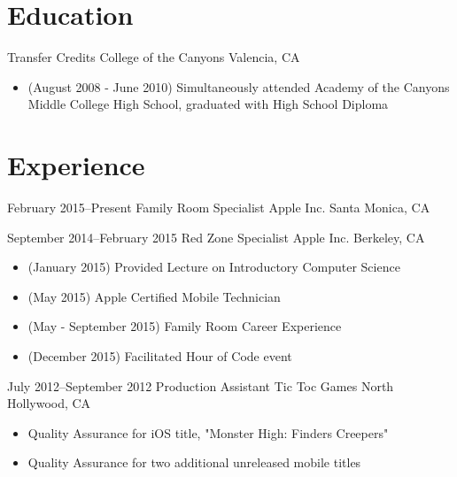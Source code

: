\documentclass[11pt,a4paper,sans]{moderncv}        %
\begin{document}
\makecvtitle

\section{Education}
 {Transfer Credits}
{College of the Canyons}    {Valencia, CA}
{}
{
  \begin{itemize}
  \item (August 2008 - June 2010) Simultaneously attended Academy of the Canyons Middle College High School, graduated with High School Diploma
  \end{itemize}
}

\section{Experience}		%
\cventry
{February 2015--Present}    {Family Room Specialist}
{Apple Inc.}                {Santa Monica, CA}
{}
{}      %

\cventry
{September 2014--February 2015}	{Red Zone Specialist}
{Apple Inc.}	{Berkeley, CA}
{}
{
  \begin{itemize}
  \item (January 2015) Provided Lecture on Introductory Computer Science 
  \item (May 2015) Apple Certified Mobile Technician
  \item (May - September 2015) Family Room Career Experience
  \item (December 2015) Facilitated Hour of Code event
  \end{itemize}
}	%

\cventry
{July 2012--September 2012}	{Production Assistant}
{Tic Toc Games}	{North Hollywood, CA}
{}
{
  \begin{itemize}
  \item Quality Assurance for iOS title, "Monster High: Finders Creepers"
  \item Quality Assurance for two additional unreleased mobile titles
  \end{itemize}
}	%
\end{document}

